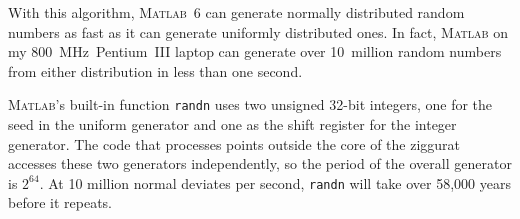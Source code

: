 \documentclass[a4paper,twocolumn,11pt]{article}
\newcommand{\Matlab}{{\textsc{Matlab}}}
\begin{document}
With this algorithm, {\Matlab}~6 can generate normally distributed
random numbers as fast as it can generate uniformly distributed
ones. In fact, {\Matlab} on my 800~MHz~Pentium~III laptop can generate
over 10~million random numbers from either distribution in less than
one second.

{\Matlab}'s built-in function \verb!randn! uses two unsigned 32-bit
integers, one for the seed in the uniform generator and one as the
shift register for the integer generator. The code that processes
points outside the core of the ziggurat accesses these two generators
independently, so the period of the overall generator is $2^{64}$. At
10 million normal deviates per second, \verb!randn! will take over
58,000 years before it repeats.
\end{document}
